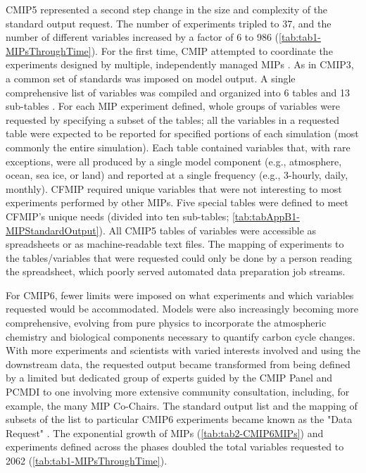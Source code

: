 \documentclass[gmd, preprint]{copernicus}
\begin{document}
CMIP5 represented a second step change in the size and complexity of the standard output request. The number of experiments tripled to 37, and the number of different variables increased by a factor of 6 to 986 (\autoref{tab:tab1-MIPsThroughTime}). For the first time, CMIP attempted to coordinate the experiments designed by multiple, independently managed MIPs \citep[even though in the overview paper, all experiments were identified by the phase only,][]{taylor_overview_2012}. As in CMIP3, a common set of standards was imposed on model output. A single comprehensive list of variables was compiled and organized into 6 tables and 13 sub-tables \citep[\autoref{tab:tab1-MIPsThroughTime}, \autoref{tab:tabAppB1-MIPStandardOutput};][]{taylor_pcmdi_2013}. For each MIP experiment defined, whole groups of variables were requested by specifying a subset of the tables; all the variables in a requested table were expected to be reported for specified portions of each simulation (most commonly the entire simulation). Each table contained variables that, with rare exceptions, were all produced by a single model component (e.g., atmosphere, ocean, sea ice, or land) and reported at a single frequency (e.g., 3-hourly, daily, monthly). CFMIP required unique variables that were not interesting to most experiments performed by other MIPs. Five special tables were defined to meet CFMIP's unique needs (divided into ten sub-tables; \autoref{tab:tabAppB1-MIPStandardOutput}). All CMIP5 tables of variables were accessible as spreadsheets or as machine-readable text files. The mapping of experiments to the tables/variables that were requested could only be done by a person reading the spreadsheet, which poorly served automated data preparation job streams.

For CMIP6, fewer limits were imposed on what experiments and which variables requested would be accommodated. Models were also increasingly becoming more comprehensive, evolving from pure physics to incorporate the atmospheric chemistry and biological components necessary to quantify carbon cycle changes. With more experiments and scientists with varied interests involved and using the downstream data, the requested output became transformed from being defined by a limited but dedicated group of experts guided by the CMIP Panel and PCMDI to one involving more extensive community consultation, including, for example, the many MIP Co-Chairs. The standard output list and the mapping of subsets of the list to particular CMIP6 experiments became known as the "Data Request" \citep{juckes_cmip6_2020}. The exponential growth of MIPs (\autoref{tab:tab2-CMIP6MIPs}) and experiments defined across the phases doubled the total variables requested to 2062 (\autoref{tab:tab1-MIPsThroughTime}). 
\end{document}
